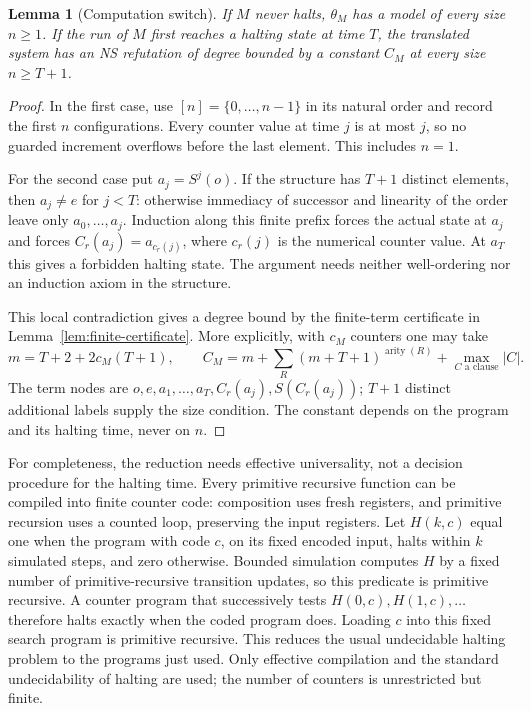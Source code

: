 \documentclass[11pt,a4paper]{article}
\newtheorem{lemma}[theorem]{Lemma}
\theoremstyle{definition}\newtheorem{definition}[theorem]{Definition}
\theoremstyle{remark}\newtheorem{remark}[theorem]{Remark}
\begin{document}
\begin{lemma}[Computation switch]\label{lem:switch}
If $M$ never halts, $\theta_M$ has a model of every size $n\ge1$.
If the run of $M$ first reaches a halting state at time $T$, the translated system has an NS refutation of
degree bounded by a constant $C_M$ at every size $n\ge T+1$.
\end{lemma}
\begin{proof}
In the first case, use $[n]=\{0,\ldots,n-1\}$ in its natural order and
record the first $n$ configurations. Every counter value at time $j$ is at
most $j$, so no guarded increment overflows before the last element.
This includes $n=1$.

For the second case put $a_j=S^j(o)$. If the structure has $T+1$ distinct
elements, then $a_j\ne e$ for $j<T$: otherwise immediacy of successor and
linearity of the order leave only $a_0,\ldots,a_j$. Induction along this
finite prefix forces the actual state at $a_j$ and forces
$C_r(a_j)=a_{c_r(j)}$, where $c_r(j)$ is the numerical counter value.
At $a_T$ this gives a forbidden halting state. The argument needs neither
well-ordering nor an induction axiom in the structure.

This local contradiction gives a degree bound by the finite-term
certificate in Lemma~\ref{lem:finite-certificate}. More explicitly, with $c_M$
counters one may take
\[
 m=T+2+2c_M(T+1),\qquad
 C_M=m+\sum_R(m+T+1)^{\operatorname{arity}(R)}
                  +\max_{C\text{ a clause}}|C|.
\]
The term nodes are $o,e,a_1,\ldots,a_T,C_r(a_j),S(C_r(a_j))$;
$T+1$ distinct additional labels supply the size condition. The constant
depends on the program and its halting time, never on $n$.
\end{proof}

For completeness, the reduction needs effective universality, not a
decision procedure for the halting time. Every primitive recursive function
can be compiled into finite counter code: composition uses fresh registers,
and primitive recursion uses a counted loop, preserving the input registers.
Let $H(k,c)$ equal one when the program with code $c$, on its fixed
encoded input, halts within $k$ simulated steps, and zero otherwise.
Bounded simulation computes $H$ by a fixed number of primitive-recursive
transition updates, so this predicate is primitive recursive. A counter program that successively tests
$H(0,c),H(1,c),\ldots$ therefore halts exactly when the coded program does.
Loading $c$ into this fixed search program is primitive recursive. This
reduces the usual undecidable halting problem to the programs just used.
Only effective compilation and the standard undecidability of halting are used; the number of counters is unrestricted but finite.
\end{document}
